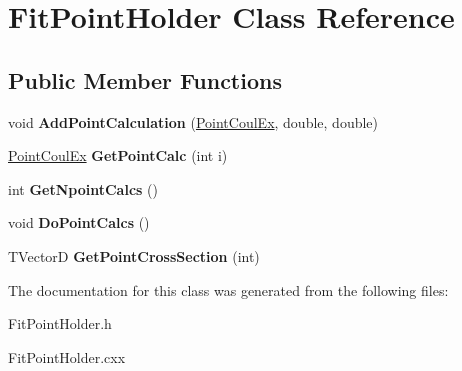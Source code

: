 \hypertarget{classFitPointHolder}{\section{Fit\-Point\-Holder Class Reference}
\label{classFitPointHolder}
}
\subsection*{Public Member Functions}
\begin{DoxyCompactItemize}
\item 
\hypertarget{classFitPointHolder_ae768cdee1d37b517e57cfc2fb0fe4c82}{void {\bfseries Add\-Point\-Calculation} (\hyperlink{classPointCoulEx}{Point\-Coul\-Ex}, double, double)}\label{classFitPointHolder_ae768cdee1d37b517e57cfc2fb0fe4c82}

\item 
\hypertarget{classFitPointHolder_aebba222585cc6e5426f7bc2a187a0821}{\hyperlink{classPointCoulEx}{Point\-Coul\-Ex} {\bfseries Get\-Point\-Calc} (int i)}\label{classFitPointHolder_aebba222585cc6e5426f7bc2a187a0821}

\item 
\hypertarget{classFitPointHolder_a509647bb0dea967aa0d1bac65c436513}{int {\bfseries Get\-Npoint\-Calcs} ()}\label{classFitPointHolder_a509647bb0dea967aa0d1bac65c436513}

\item 
\hypertarget{classFitPointHolder_a5d1b2201612cb7cb1864cf36a70a01a4}{void {\bfseries Do\-Point\-Calcs} ()}\label{classFitPointHolder_a5d1b2201612cb7cb1864cf36a70a01a4}

\item 
\hypertarget{classFitPointHolder_a70387b912d0f45fb0f7e93cb7e87fe35}{T\-Vector\-D {\bfseries Get\-Point\-Cross\-Section} (int)}\label{classFitPointHolder_a70387b912d0f45fb0f7e93cb7e87fe35}

\end{DoxyCompactItemize}


The documentation for this class was generated from the following files\-:\begin{DoxyCompactItemize}
\item 
Fit\-Point\-Holder.\-h\item 
Fit\-Point\-Holder.\-cxx\end{DoxyCompactItemize}
